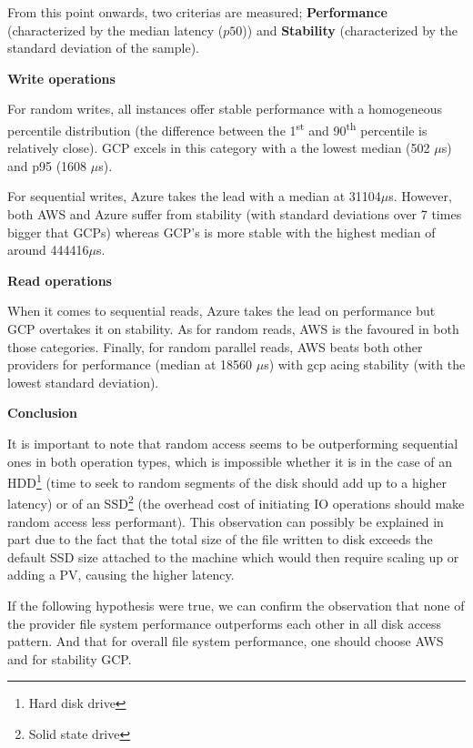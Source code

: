 \documentclass[11pt]{article}
\begin{document}
From this point onwards, two criterias are measured; \textbf{Performance} (characterized by the median latency ($p50$)) and \textbf{Stability} (characterized by the standard deviation of the sample).

\textbf{Write operations}

For random writes, all instances offer stable performance with a homogeneous percentile distribution (the difference between the 1\textsuperscript{st} and 90\textsuperscript{th} percentile is relatively close). GCP excels in this category with a the lowest median (502 $\mu$s) and p95 (1608 $\mu$s).

For sequential writes, Azure takes the lead with a median at 31104$\mu$s. However, both AWS and Azure suffer from stability (with standard deviations over 7 times bigger that GCPs) whereas GCP's is more stable with the highest median of around 444416$\mu$s. 

\vspace{3mm}
\textbf{Read operations}

When it comes to sequential reads, Azure takes the lead on performance but GCP overtakes it on stability. As for random reads, AWS is the favoured in both those categories. Finally, for random parallel reads, AWS beats both other providers for performance (median at 18560 $\mu$s) with gcp acing stability (with the lowest standard deviation).

\textbf{Conclusion}

It is important to note that random access seems to be outperforming sequential ones in both operation types, which is impossible whether it is in the case of an HDD\footnote{Hard disk drive} (time to seek to random segments of the disk should add up to a higher latency) or of an SSD\footnote{Solid state drive} (the overhead cost of initiating IO operations should make random access less performant). This observation can possibly be explained in part due to the fact that the total size of the file written to disk exceeds the default SSD size attached to the machine which would then require scaling up or adding a PV, causing the higher latency.

If the following hypothesis were true, we can confirm the observation that none of the provider file system performance outperforms each other in all disk access pattern. And that for overall file system performance, one should choose AWS and for stability GCP. 

\end{document}
